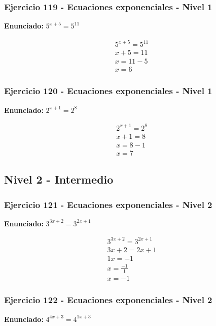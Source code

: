 \documentclass[12pt,a4paper]{article}
\begin{document}
\subsubsection*{Ejercicio 119 - Ecuaciones exponenciales - Nivel 1}
\textbf{Enunciado:} \(5^{x+5}=5^{11}\)

\[
\begin{aligned}
5^{x+5}=5^{11}\\
x+5=11\\
x=11-5\\
\boxed{x=6}
\end{aligned}
\]


\subsubsection*{Ejercicio 120 - Ecuaciones exponenciales - Nivel 1}
\textbf{Enunciado:} \(2^{x+1}=2^{8}\)

\[
\begin{aligned}
2^{x+1}=2^{8}\\
x+1=8\\
x=8-1\\
\boxed{x=7}
\end{aligned}
\]


\newpage

\subsection*{Nivel 2 - Intermedio}

\subsubsection*{Ejercicio 121 - Ecuaciones exponenciales - Nivel 2}
\textbf{Enunciado:} \(3^{3x+2}=3^{2x+1}\)

\[
\begin{aligned}
3^{3x+2}=3^{2x+1}\\
3x+2=2x+1\\
1x=-1\\
x=\frac{-1}{1}\\
\boxed{x=-1}
\end{aligned}
\]


\subsubsection*{Ejercicio 122 - Ecuaciones exponenciales - Nivel 2}
\textbf{Enunciado:} \(4^{4x+3}=4^{1x+3}\)
\end{document}
